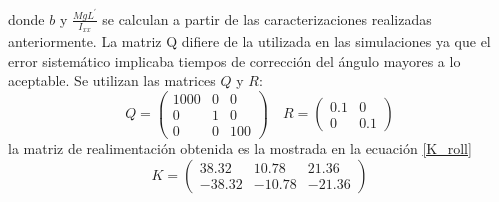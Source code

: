 \documentclass[main]{subfiles}
\begin{document}
donde $b$ y $\frac{MgL^\prime}{I_{xx}}$ se calculan a partir de las caracterizaciones realizadas anteriormente. La matriz Q difiere de la utilizada en las simulaciones ya que el error sistem\'atico implicaba tiempos de correcci\'on del \'angulo mayores a lo aceptable. Se utilizan las matrices $Q$ y $R$:
\begin{equation}
\label{eq:Q_R_roll}
Q = \left(\begin{array}{ccc}
1000 & 0 & 0\\
0 & 1 & 0\\
0 & 0 & 100 
\end{array} \right) \quad R =\left(\begin{array}{cc}
0.1 & 0 \\
0 & 0.1
\end{array}\right)
\end{equation}
la matriz de realimentaci\'on obtenida es la mostrada en la ecuación \ref{K_roll}
\begin{equation}
\label{K_roll}
K = \left( \begin{array}{ccc}
38.32 & 10.78 &21.36\\
-38.32 & -10.78 &-21.36
\end{array}\right)
\end{equation}
\end{document}
